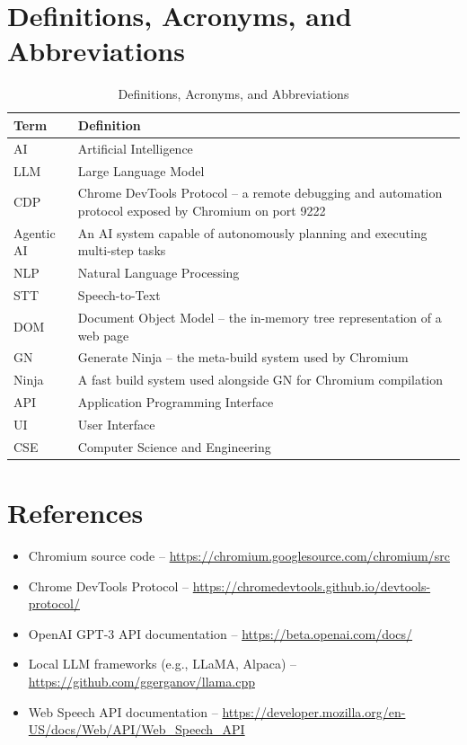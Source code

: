 \section{Definitions, Acronyms, and Abbreviations}
\begin{longtable}{|p{4cm}|p{10cm}|}
\caption{Definitions, Acronyms, and Abbreviations} \\
\hline
\textbf{Term} & \textbf{Definition} \\ \hline
\endhead
AI & Artificial Intelligence \\ \hline
LLM & Large Language Model \\ \hline
CDP & Chrome DevTools Protocol -- a remote debugging and automation protocol exposed by Chromium on port 9222 \\ \hline
Agentic AI & An AI system capable of autonomously planning and executing multi-step tasks \\ \hline
NLP & Natural Language Processing \\ \hline
STT & Speech-to-Text \\ \hline
DOM & Document Object Model -- the in-memory tree representation of a web page \\ \hline
GN & Generate Ninja -- the meta-build system used by Chromium \\ \hline
Ninja & A fast build system used alongside GN for Chromium compilation \\ \hline
API & Application Programming Interface \\ \hline
UI & User Interface \\ \hline
CSE & Computer Science and Engineering \\ \hline
\end{longtable}

\section{References}
\begin{itemize}[leftmargin=*]
    \item Chromium source code -- \url{https://chromium.googlesource.com/chromium/src}
    \item Chrome DevTools Protocol -- \url{https://chromedevtools.github.io/devtools-protocol/}
    \item OpenAI GPT-3 API documentation -- \url{https://beta.openai.com/docs/}
    \item Local LLM frameworks (e.g., LLaMA, Alpaca) -- \url{https://github.com/ggerganov/llama.cpp}
    \item Web Speech API documentation -- \url{https://developer.mozilla.org/en-US/docs/Web/API/Web_Speech_API}
\end{itemize}

